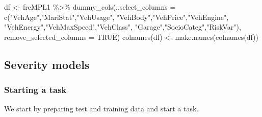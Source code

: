 \documentclass[
]{article}
\newenvironment{Shaded}{\begin{snugshade}}{\end{snugshade}}
\newcommand{\AttributeTok}[1]{\textcolor[rgb]{0.77,0.63,0.00}{#1}}
\newcommand{\ConstantTok}[1]{\textcolor[rgb]{0.00,0.00,0.00}{#1}}
\newcommand{\FunctionTok}[1]{\textcolor[rgb]{0.00,0.00,0.00}{#1}}
\newcommand{\NormalTok}[1]{#1}
\newcommand{\OtherTok}[1]{\textcolor[rgb]{0.56,0.35,0.01}{#1}}
\newcommand{\SpecialCharTok}[1]{\textcolor[rgb]{0.00,0.00,0.00}{#1}}
\newcommand{\StringTok}[1]{\textcolor[rgb]{0.31,0.60,0.02}{#1}}
\begin{document}
\begin{Shaded}
\begin{Highlighting}[]
\NormalTok{df }\OtherTok{\textless{}{-}}\NormalTok{ freMPL1 }\SpecialCharTok{\%\textgreater{}\%}
  \FunctionTok{dummy\_cols}\NormalTok{(.,}\AttributeTok{select\_columns =} \FunctionTok{c}\NormalTok{(}\StringTok{"VehAge"}\NormalTok{,}\StringTok{"MariStat"}\NormalTok{,}\StringTok{"VehUsage"}\NormalTok{,}
                                  \StringTok{"VehBody"}\NormalTok{,}\StringTok{"VehPrice"}\NormalTok{,}\StringTok{"VehEngine"}\NormalTok{,}
                                  \StringTok{"VehEnergy"}\NormalTok{,}\StringTok{"VehMaxSpeed"}\NormalTok{,}\StringTok{"VehClass"}\NormalTok{,}
                                  \StringTok{"Garage"}\NormalTok{,}\StringTok{"SocioCateg"}\NormalTok{,}\StringTok{"RiskVar"}\NormalTok{),}
             \AttributeTok{remove\_selected\_columns =} \ConstantTok{TRUE}\NormalTok{)}
\FunctionTok{colnames}\NormalTok{(df) }\OtherTok{\textless{}{-}} \FunctionTok{make.names}\NormalTok{(}\FunctionTok{colnames}\NormalTok{(df))}
\end{Highlighting}
\end{Shaded}

\hypertarget{severity-models}{%
\subsection{Severity models}\label{severity-models}}

\hypertarget{starting-a-task}{%
\subsubsection{Starting a task}\label{starting-a-task}}

We start by preparing test and training data and start a task.
\end{document}
